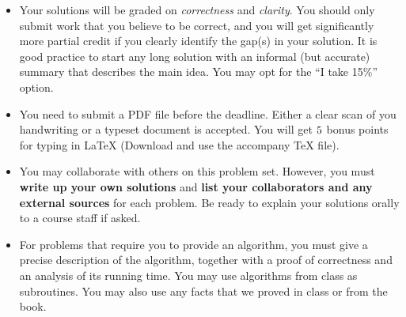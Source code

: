 \begin{itemize}
\item Your solutions will be graded on \emph{correctness} and
  \emph{clarity}. You should only submit work that you believe to be
  correct, and you will get significantly more partial credit if you
  clearly identify the gap(s) in your solution. It is good practice to
  start any long solution with an informal (but accurate) summary that
  describes the main idea. You may opt for the ``I take 15\%'' option.

\item You need to submit a PDF file before the deadline. Either a
  clear scan of you handwriting or a typeset document is accepted. You
  will get $5$ bonus points for typing in LaTeX (Download and use
  the accompany TeX file).

\item You may collaborate with others on this problem set.  However,
  you must \textbf{{write up your own solutions}} and \textbf{{list
      your collaborators and any external sources}} for each
  problem. Be ready to explain your solutions orally to a course staff
  if asked.

\item For problems that require you to provide an algorithm, you must
  give a precise description of the algorithm, together with a proof
  of correctness and an analysis of its running time. You may use
  algorithms from class as subroutines. You may also use any facts
  that we proved in class or from the book.

\end{itemize}

\newpage

